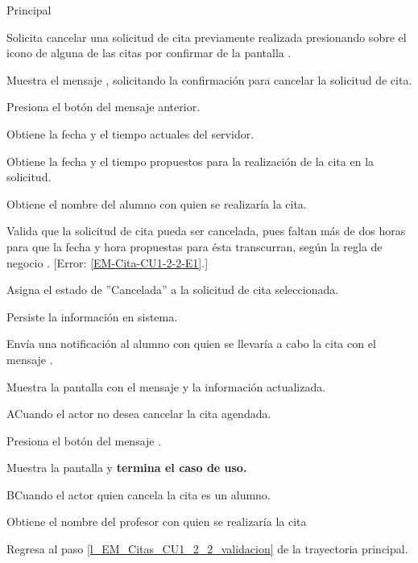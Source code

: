 \begin{UCtrayectoria}{Principal}

	\UCpaso [\UCactor] Solicita cancelar una solicitud de cita previamente realizada presionando sobre el icono  de alguna de las citas por confirmar de la pantalla .

	\UCpaso Muestra el mensaje , solicitando la confirmación para cancelar la solicitud de cita. 

	\UCpaso Presiona el botón  del mensaje anterior.  
 
	\UCpaso Obtiene la fecha y el tiempo actuales del servidor.

	\UCpaso Obtiene la fecha y el tiempo propuestos para la realización de la cita en la solicitud.

	\UCpaso Obtiene el nombre del alumno con quien se realizaría la cita. 

	\UCpaso Valida que la solicitud de cita pueda ser cancelada, pues faltan más de dos horas para que la fecha y hora propuestas para ésta transcurran, según la regla de negocio . [Error: \ref{EM-Cita-CU1-2-2-E1}.] \label{l_EM_Citas_CU1_2_2_validacion}

	\UCpaso Asigna el estado de ''Cancelada'' a la solicitud de cita seleccionada. 

	\UCpaso Persiste la información en sistema. 

	\UCpaso Envía una notificación al alumno con quien se llevaría a cabo la cita con el mensaje .

	\UCpaso Muestra la pantalla  con el mensaje  y la información actualizada.
	

\end{UCtrayectoria}

\begin{UCtrayectoriaA}{A}{Cuando el actor no desea cancelar la cita agendada.}

	\UCpaso Presiona el botón  del mensaje .

	\UCpaso Muestra la pantalla  y \textbf{termina el caso de uso.}

\end{UCtrayectoriaA}

\begin{UCtrayectoriaA}{B}{Cuando el actor quien cancela la cita es un alumno.}

	\UCpaso Obtiene el nombre del profesor con quien se realizaría la cita

	\UCpaso Regresa al paso \ref{l_EM_Citas_CU1_2_2_validacion} de la trayectoria principal.

\end{UCtrayectoriaA}
